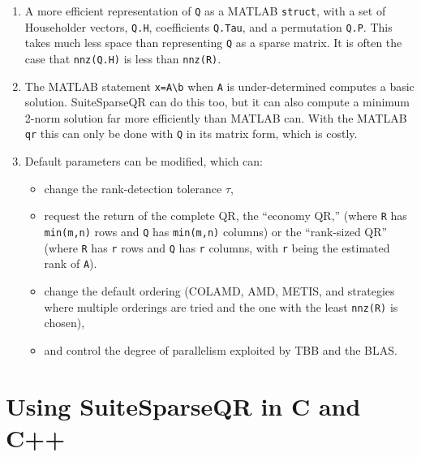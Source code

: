\documentclass[12pt]{article}
\begin{document}
\begin{enumerate}

    \item A more efficient representation of \verb'Q' as a MATLAB
    \verb'struct', with a set of Householder vectors, \verb'Q.H', coefficients
    \verb'Q.Tau', and a permutation \verb'Q.P'.  This takes much less space
    than representing \verb'Q' as a sparse matrix.  It is often the case that
    \verb'nnz(Q.H)' is less than \verb'nnz(R)'.

    \item The MATLAB statement \verb'x=A\b' when \verb'A' is under-determined
    computes a basic solution.  SuiteSparseQR can do this too, but it can also
    compute a minimum 2-norm solution far more efficiently than MATLAB can.
    With the MATLAB \verb'qr' this can only be done with \verb'Q' in its matrix
    form, which is costly.

    \item Default parameters can be modified, which can:

    \begin{itemize}
    
        \item change the rank-detection tolerance $\tau$,

        \item request the return of the complete QR, the ``economy QR,'' (where
        \verb'R' has \verb'min(m,n)' rows and \verb'Q' has \verb'min(m,n)'
        columns) or the ``rank-sized QR'' (where \verb'R' has \verb'r' rows and
        \verb'Q' has \verb'r' columns, with \verb'r' being the estimated rank
        of \verb'A').

        \item change the default ordering (COLAMD, AMD, METIS, and
        strategies where multiple orderings are tried and the one with
        the least \verb"nnz(R)" is chosen),

        \item and control the degree of parallelism exploited by TBB and the
        BLAS.

    \end{itemize}

\end{enumerate}

\section{Using SuiteSparseQR in C and C++}
\end{document}

